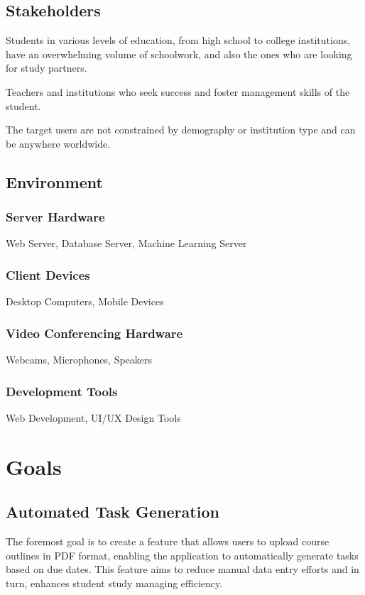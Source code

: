 \documentclass{article}
\begin{document}
\subsection{Stakeholders}

    Students in various levels of education, from high school to college institutions, have an overwhelming volume of schoolwork, and also the ones who are looking for study partners. 

    Teachers and institutions who seek success and foster management skills of the student.

    The target users are not constrained by demography or institution type and can be anywhere worldwide.

\subsection{Environment}
\subsubsection{Server Hardware}
Web Server, Database Server, Machine Learning Server
\subsubsection{Client Devices}
Desktop Computers, Mobile Devices
\subsubsection{Video Conferencing Hardware}
Webcams, Microphones, Speakers

\subsubsection{Development Tools}
Web Development, UI/UX Design Tools
\section{Goals}

    \subsection{Automated Task Generation}
    
    The foremost goal is to create a feature that allows users to upload course outlines in PDF format, enabling the application to automatically generate tasks based on due dates. This feature aims to reduce manual data entry efforts and in turn, enhances student study managing efficiency.
       
\end{document}
